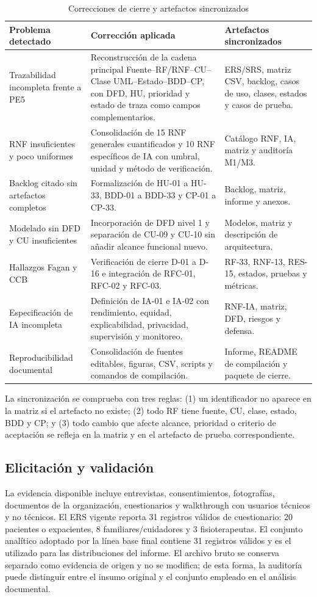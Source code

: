 \documentclass[12pt,a4paper]{article}
\begin{document}
\begin{table}[H]\centering\caption{Correcciones de cierre y artefactos sincronizados}
\small
\begin{tabularx}{\textwidth}{p{}X X}
\toprule
\textbf{Problema detectado}&\textbf{Corrección aplicada}&\textbf{Artefactos sincronizados}\\\midrule
Trazabilidad incompleta frente a PE5&Reconstrucción de la cadena principal Fuente--RF/RNF--CU--Clase UML--Estado--BDD--CP, con DFD, HU, prioridad y estado de traza como campos complementarios.&ERS/SRS, matriz CSV, backlog, casos de uso, clases, estados y casos de prueba.\\
RNF insuficientes y poco uniformes&Consolidación de 15 RNF generales cuantificados y 10 RNF específicos de IA con umbral, unidad y método de verificación.&Catálogo RNF, IA, matriz y auditoría M1/M3.\\
Backlog citado sin artefactos completos&Formalización de HU-01 a HU-33, BDD-01 a BDD-33 y CP-01 a CP-33.&Backlog, matriz, informe y anexos.\\
Modelado sin DFD y CU insuficientes&Incorporación de DFD nivel 1 y separación de CU-09 y CU-10 sin añadir alcance funcional nuevo.&Modelos, matriz y descripción de arquitectura.\\
Hallazgos Fagan y CCB&Verificación de cierre D-01 a D-16 e integración de RFC-01, RFC-02 y RFC-03.&RF-33, RNF-13, RES-15, estados, pruebas y métricas.\\
Especificación de IA incompleta&Definición de IA-01 e IA-02 con rendimiento, equidad, explicabilidad, privacidad, supervisión y monitoreo.&RNF-IA, matriz, DFD, riesgos y defensa.\\
Reproducibilidad documental&Consolidación de fuentes editables, figuras, CSV, scripts y comandos de compilación.&Informe, README de compilación y paquete de cierre.\\
\bottomrule
\end{tabularx}
\normalsize
\end{table}

La sincronización se comprueba con tres reglas: (1) un identificador no aparece en la matriz si el artefacto no existe; (2) todo RF tiene fuente, CU, clase, estado, BDD y CP; y (3) todo cambio que afecte alcance, prioridad o criterio de aceptación se refleja en la matriz y en el artefacto de prueba correspondiente.

\subsection{Elicitación y validación}
La evidencia disponible incluye entrevistas, consentimientos, fotografías, documentos de la organización, cuestionarios y walkthrough con usuarios técnicos y no técnicos. El ERS vigente reporta 31 registros válidos de cuestionario: 20 pacientes o expacientes, 8 familiares/cuidadores y 3 fisioterapeutas. El conjunto analítico adoptado por la línea base final contiene 31 registros válidos y es el utilizado para las distribuciones del informe. El archivo bruto se conserva separado como evidencia de origen y no se modifica; de esta forma, la auditoría puede distinguir entre el insumo original y el conjunto empleado en el análisis documental.
\end{document}

